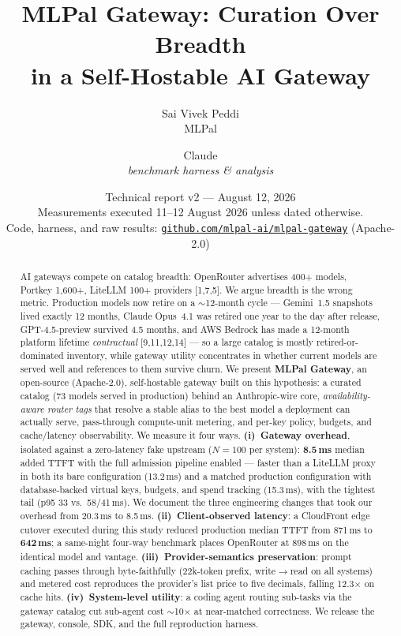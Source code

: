 \documentclass[10pt]{article}
\title{\bfseries MLPal Gateway: Curation Over Breadth\\in a Self-Hostable AI Gateway}
\author{Sai Vivek Peddi\\MLPal \and Claude\\\textit{benchmark harness \& analysis}}
\date{Technical report v2 --- August 12, 2026\\[2pt]\small Measurements executed 11--12 August 2026 unless dated otherwise.\\\small Code, harness, and raw results: \href{https://github.com/mlpal-ai/mlpal-gateway}{\texttt{github.com/mlpal-ai/mlpal-gateway}} (Apache-2.0)}
\begin{document}
\maketitle

\begin{abstract}
AI gateways compete on catalog breadth: OpenRouter advertises 400+ models, Portkey 1{,}600+, LiteLLM 100+ providers [1,7,5]. We argue breadth is the wrong metric. Production models now retire on a $\sim$12-month cycle --- Gemini~1.5 snapshots lived exactly 12 months, Claude Opus~4.1 was retired one year to the day after release, GPT-4.5-preview survived 4.5 months, and AWS Bedrock has made a 12-month platform lifetime \emph{contractual} [9,11,12,14] --- so a large catalog is mostly retired-or-dominated inventory, while gateway utility concentrates in whether current models are served well and references to them survive churn. We present \textbf{MLPal Gateway}, an open-source (Apache-2.0), self-hostable gateway built on this hypothesis: a curated catalog (73 models served in production) behind an Anthropic-wire core, \emph{availability-aware router tags} that resolve a stable alias to the best model a deployment can actually serve, pass-through compute-unit metering, and per-key policy, budgets, and cache/latency observability. We measure it four ways. \textbf{(i)~Gateway overhead}, isolated against a zero-latency fake upstream ($N{=}100$ per system): \textbf{8.5\,ms} median added TTFT with the full admission pipeline enabled --- faster than a LiteLLM proxy in both its bare configuration (13.2\,ms) and a matched production configuration with database-backed virtual keys, budgets, and spend tracking (15.3\,ms), with the tightest tail (p95 33 vs.\ 58/41\,ms). We document the three engineering changes that took our overhead from 20.3\,ms to 8.5\,ms. \textbf{(ii)~Client-observed latency}: a CloudFront edge cutover executed during this study reduced production median TTFT from 871\,ms to \textbf{642\,ms}; a same-night four-way benchmark places OpenRouter at 898\,ms on the identical model and vantage. \textbf{(iii)~Provider-semantics preservation}: prompt caching passes through byte-faithfully (22k-token prefix, write$\rightarrow$read on all systems) and metered cost reproduces the provider's list price to five decimals, falling 12.3$\times$ on cache hits. \textbf{(iv)~System-level utility}: a coding agent routing sub-tasks via the gateway catalog cut sub-agent cost $\sim$10$\times$ at near-matched correctness. We release the gateway, console, SDK, and the full reproduction harness.
\end{abstract}
\end{document}
